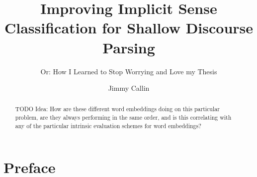 \documentclass[master,times]{stpthesis}
\begin{document}
\author{Jimmy Callin}
\title{Improving Implicit Sense Classification for Shallow Discourse Parsing}
\subtitle{Or: How I Learned to Stop Worrying and Love my Thesis}

\maketitle
\frontmatter*

\begin{abstract}
  TODO
  Idea: How are these different word embeddings doing on this particular problem, are they always performing in the same order, and is this correlating with any of the particular intrinsic evaluation schemes for word embeddings?
\end{abstract}

\clearpage
\tableofcontents*

\chapter{Preface}

\mainmatter*








\end{document}
